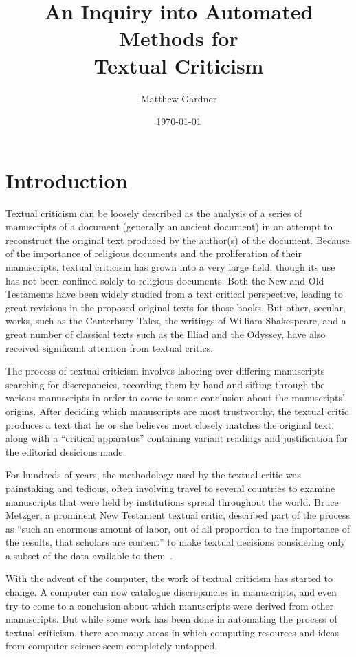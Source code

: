 \documentclass[onecolumn, 12pt]{article}
\title{An Inquiry into Automated Methods for\\Textual Criticism}
\author{Matthew Gardner}
\date{\today}
\begin{document}
\maketitle

\section{Introduction}
\label{sec:intro}

Textual criticism can be loosely described as the analysis of a series of
manuscripts of a document (generally an ancient document) in an attempt to
reconstruct the original text produced by the author(s) of the document.
Because of the importance of religious documents and the proliferation of their
manuscripts, textual criticism has grown into a very large field, though its
use has not been confined solely to religious documents.  Both the New and Old
Testaments have been widely studied from a text critical perspective, leading
to great revisions in the proposed original texts for those books.  But other,
secular, works, such as the Canterbury Tales, the writings of William
Shakespeare, and a great number of classical texts such as the Illiad and the
Odyssey, have also received significant attention from textual critics.

The process of textual criticism involves laboring over differing manuscripts
searching for discrepancies, recording them by hand and sifting through the
various manuscripts in order to come to some conclusion about the manuscripts'
origins.  After deciding which manuscripts are most trustworthy, the textual
critic produces a text that he or she believes most closely matches the
original text, along with a ``critical apparatus'' containing variant readings
and justification for the editorial desicions made.

For hundreds of years, the methodology used by the textual critic was
painstaking and tedious, often involving travel to several countries to examine
manuscripts that were held by institutions spread throughout the world.  Bruce
Metzger, a prominent New Testament textual critic, described part of the
process as ``such an enormous amount of labor, out of all proportion to the
importance of the results, that scholars are content'' to make textual
decisions considering only a subset of the data available to
them~\cite[179]{metzger-1992-text-of-the-new-testament}.

With the advent of the computer, the work of textual criticism has started to
change.  A computer can now catalogue discrepancies in manuscripts, and even
try to come to a conclusion about which manuscripts were derived from other
manuscripts.  But while some work has been done in automating the process of
textual criticism, there are many areas in which computing resources and ideas
from computer science seem completely untapped.
\end{document}
